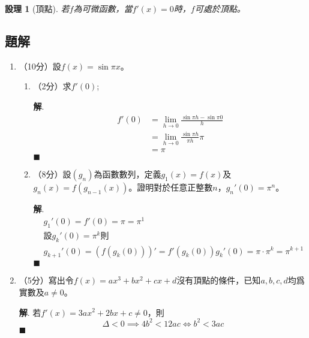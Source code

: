 \documentclass[12pt]{article}
\newtheorem*{proposition}{設理}
\newenvironment*{sol}{\par \textbf{解}.}{\hfill$\blacksquare$}
\begin{document}
    \begin{proposition}[頂點]
        若$f$為可微函數，當$f'(x)=0$時，$f$可處於頂點。
    \end{proposition}

    \subsection*{題解}

    \begin{enumerate}
        \item （10分）設$f(x)=\sin{\pi x}$。\begin{enumerate}
            \item （2分）求$f'(0)$;\begin{sol}
                \begin{align*}
                    f'(0)&=\lim_{h\to 0}\frac{\sin{\pi h}-\sin{\pi 0}}{h}\\
                    &=\lim_{h\to 0}\frac{\sin{\pi h}}{\pi h}\pi\\
                    &=\pi
                \end{align*}
            \end{sol}
            \item （8分）設$(g_n)$為函數數列，定義$g_1(x)=f(x)$及$g_n(x)=f(g_{n-1}(x))$。證明對於任意正整數$n$，$g_n'(0)=\pi^n$。\begin{sol}
                \begin{align*}
                    &g_1'(0)=f'(0)=\pi=\pi^1\\
                    &\textrm{設}g_k'(0)=\pi^k\textrm{則}\\
                    &g_{k+1}'(0)=(f(g_k(0)))'=f'(g_k(0))g_k'(0)=\pi\cdot\pi^k=\pi^{k+1}
                \end{align*}
            \end{sol}
        \end{enumerate}
        \item （5分）寫出令$f(x)=ax^3+bx^2+cx+d$沒有頂點的條件，已知$a,b,c,d$均爲實數及$a\neq 0$。\begin{sol}
            若$f'(x)=3ax^2+2bx+c\neq 0$，則$$\Delta<0\implies 4b^2<12ac\iff b^2<3ac$$
        \end{sol}
    \end{enumerate}
\end{document}
